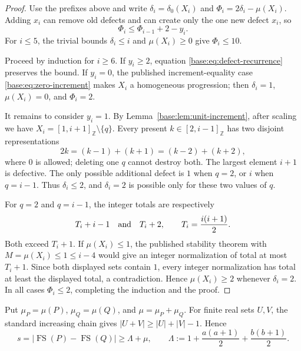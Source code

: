 \documentclass[11pt,a4paper]{article}
\theoremstyle{remark}
\newcommand{\FS}{\operatorname{FS}}
\newcommand{\card}[1]{\lvert #1\rvert}
\begin{document}
\begin{proof}
Use the prefixes above and write $\delta_i=\delta_0(X_i)$ and
$\Phi_i=2\delta_i-\mu(X_i)$.  Adding $x_i$ can remove old defects and can
create only the one new defect $x_i$, so
\begin{equation}
 \Phi_i\leq\Phi_{i-1}+2-y_i.
 \label{base:eq:defect-recurrence}
\end{equation}
For $i\leq5$, the trivial bounds $\delta_i\leq i$ and $\mu(X_i)\geq0$
give $\Phi_i\leq10$.

Proceed by induction for $i\geq6$.  If $y_i\geq2$, equation
\eqref{base:eq:defect-recurrence} preserves the bound.  If $y_i=0$, the published
increment-equality case \eqref{base:eq:zero-increment} makes $X_i$ a homogeneous
progression; then $\delta_i=1$, $\mu(X_i)=0$, and $\Phi_i=2$.

It remains to consider $y_i=1$.  By Lemma~\ref{base:lem:unit-increment}, after
scaling we have $X_i=[1,i+1]_{\mathbb Z}\setminus\{q\}$.  Every present
$k\in[2,i-1]_{\mathbb Z}$ has two disjoint representations
\[
 2k=(k-1)+(k+1)=(k-2)+(k+2),
\]
where $0$ is allowed; deleting one $q$ cannot destroy both.  The largest
element $i+1$ is defective.  The only possible additional defect is $1$
when $q=2$, or $i$ when $q=i-1$.  Thus $\delta_i\leq2$, and
$\delta_i=2$ is possible only for these two values of $q$.

For $q=2$ and $q=i-1$, the integer totals are respectively
\[
 T_i+i-1\quad\hbox{and}\quad T_i+2,
 \qquad T_i=\frac{i(i+1)}2.
\]
Both exceed $T_i+1$.  If $\mu(X_i)\leq1$, the published stability theorem
with $M=\mu(X_i)\leq1\leq i-4$ would give an integer normalization of total
at most $T_i+1$.  Since both displayed sets contain $1$, every integer
normalization has total at least the displayed total, a contradiction.
Hence $\mu(X_i)\geq2$ whenever $\delta_i=2$.  In all cases
$\Phi_i\leq2$, completing the induction and the proof.
\end{proof}

Put $\mu_P=\mu(P)$, $\mu_Q=\mu(Q)$, and $\mu=\mu_P+\mu_Q$.  For finite
real sets $U,V$, the standard increasing chain gives
$\card{U+V}\geq\card U+\card V-1$.  Hence
\begin{equation}
 s=\card{\FS(P)-\FS(Q)}\geq\Lambda+\mu,
 \qquad
 \Lambda:=1+\frac{a(a+1)}2+\frac{b(b+1)}2.
 \label{base:eq:core-lower}
\end{equation}
\end{document}
